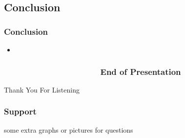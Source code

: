 \subsection{Conclusion} %
\begin{frame}[red] %
\frametitle{Conclusion}

\begin{itemize}
\item 
\end{itemize}

 
\end{frame}


\begin{frame}[plain] %
\frametitle{\;~~~~~~~~~~~~~~~~~~~~~End of Presentation}

\vspace{9em}
\begin{center}
    \Huge Thank You For Listening
\end{center}
\end{frame}


\begin{frame}[plain] %
\frametitle{Support}

some extra graphs or pictures for questions

\end{frame}